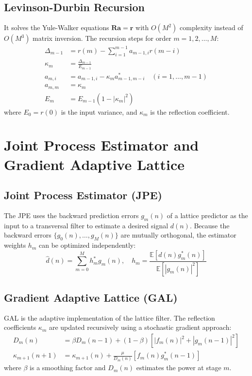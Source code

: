 \documentclass[12pt,a4paper]{article}
\begin{document}
\subsection{Levinson-Durbin Recursion}
It solves the Yule-Walker equations $\mathbf{R}\mathbf{a} = \mathbf{r}$ with $O(M^2)$ complexity instead of $O(M^3)$ matrix inversion. The recursion steps for order $m=1, 2, \dots, M$:
\begin{align}
  \Delta_{m-1} &= r(m) - \sum_{i=1}^{m-1} a_{m-1, i} r(m-i) \\
  \kappa_m &= \frac{\Delta_{m-1}}{E_{m-1}} \\
  a_{m, i} &= a_{m-1, i} - \kappa_m a_{m-1, m-i}^* \quad (i=1, \dots, m-1) \\
  a_{m, m} &= \kappa_m \\
  E_m &= E_{m-1}(1 - |\kappa_m|^2)
\end{align}
where $E_0 = r(0)$ is the input variance, and $\kappa_m$ is the reflection coefficient.

\section{Joint Process Estimator and Gradient Adaptive Lattice}

\subsection{Joint Process Estimator (JPE)}
The JPE uses the backward prediction errors $g_m(n)$ of a lattice predictor as the input to a transversal filter to estimate a desired signal $d(n)$. Because the backward errors $\{g_0(n), \dots, g_M(n)\}$ are mutually orthogonal, the estimator weights $h_m$ can be optimized independently:
\begin{equation}
  \hat{d}(n) = \sum_{m=0}^M h_m^* g_m(n), \quad h_m = \frac{\mathbb{E}[d(n)g_m^*(n)]}{\mathbb{E}[|g_m(n)|^2]}
\end{equation}

\subsection{Gradient Adaptive Lattice (GAL)}
GAL is the adaptive implementation of the lattice filter. The reflection coefficients $\kappa_m$ are updated recursively using a stochastic gradient approach:
\begin{align}
  D_m(n) &= \beta D_m(n-1) + (1-\beta) \left[ |f_m(n)|^2 + |g_m(n-1)|^2 \right] \\
  \kappa_{m+1}(n+1) &= \kappa_{m+1}(n) + \frac{\mu}{D_m(n)} \left[ f_m(n) g_m^*(n-1) \right]
\end{align}
where $\beta$ is a smoothing factor and $D_m(n)$ estimates the power at stage $m$.
\end{document}
